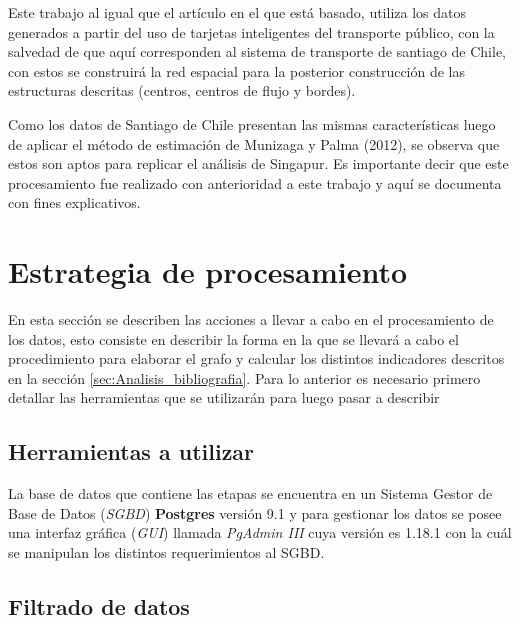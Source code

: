 \documentclass[12pt]{article}
\begin{document}
	
    Este trabajo al igual que el artículo en el que está basado, utiliza los datos generados a partir del uso de tarjetas inteligentes del transporte público, con la salvedad de que aquí corresponden al sistema de transporte de santiago de Chile, con estos se construirá  la red espacial para la posterior construcción de las estructuras descritas (centros, centros de flujo y bordes).
	
	Como los datos de Santiago de Chile presentan las mismas características luego de aplicar el método de estimación de Munizaga y Palma (2012), se observa que estos son aptos para replicar el análisis de Singapur. Es importante decir que este procesamiento fue realizado con anterioridad a este trabajo y aquí se documenta con fines explicativos.
		

    \newpage
    \section{Estrategia de procesamiento}
  
	En esta sección se describen las acciones a llevar a cabo en el procesamiento de los datos, esto consiste en describir la forma en la que se llevará a cabo el procedimiento para elaborar el grafo y calcular los distintos indicadores descritos en la sección \ref{sec:Analisis_bibliografia}. Para lo anterior es necesario primero detallar las herramientas que se utilizarán para luego pasar a describir 

	\subsection{Herramientas a utilizar}
	
	La base de datos que contiene las etapas se encuentra en un Sistema Gestor de Base de Datos (\textit{SGBD}) \textbf{Postgres} versión 9.1 y para gestionar los datos se posee una interfaz gráfica (\textit{GUI}) llamada \textit{PgAdmin III} cuya versión es 1.18.1 con la cuál se manipulan los distintos requerimientos al SGBD. 
	
	\subsection{Filtrado de datos}
	
\end{document}
